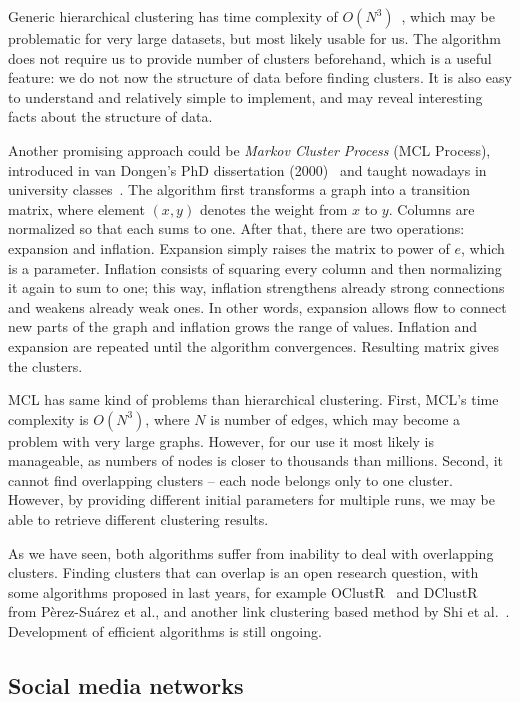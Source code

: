 \documentclass[12pt,a4paper,oneside,pdftex]{report}
\begin{document}
Generic hierarchical clustering has time complexity of $O(N^3)$~\cite{manning2008introduction}, which may be problematic for very large datasets, but most likely usable for us. The algorithm does not require us to provide number of clusters beforehand, which is a useful feature: we do not now the structure of data before finding clusters. It is also easy to understand and relatively simple to implement, and may reveal interesting facts about the structure of data.

Another promising approach could be \emph{Markov Cluster Process} (MCL Process), introduced in van Dongen's PhD dissertation (2000)~\cite{van2000graph} and taught nowadays in university classes~\cite{mlc_macropol}. The algorithm first transforms a graph into a transition matrix, where element $(x,y)$ denotes the weight from $x$ to $y$. Columns are normalized so that each sums to one. After that, there are two operations: expansion and inflation. Expansion simply raises the matrix to power of $e$, which is a parameter. Inflation consists of squaring every column and then normalizing it again to sum to one; this way, inflation strengthens already strong connections and weakens already weak ones. In other words, expansion allows flow to connect new parts of the graph and inflation grows the range of values. Inflation and expansion are repeated until the algorithm convergences. Resulting matrix gives the clusters.

MCL has same kind of problems than hierarchical clustering. First, MCL's time complexity is $O(N^3)$, where $N$ is number of edges, which may become a problem with very large graphs. However, for our use it most likely is manageable, as numbers of nodes is closer to thousands than millions. Second, it cannot find overlapping clusters -- each node belongs only to one cluster. However, by providing different initial parameters for multiple runs, we may be able to retrieve different clustering results.

As we have seen, both algorithms suffer from inability to deal with overlapping clusters. Finding clusters that can overlap is an open research question, with some algorithms proposed in last years, for example OClustR~\cite{PerezSuarez2013234} and DClustR~\cite{PerezSuarez20133040} from P\`{e}rez-Su\'{a}rez et al., and another link clustering based method by Shi et al.~\cite{Shi2013394}. Development of efficient algorithms is still ongoing.


\subsection{Social media networks}
\label{subsec:social_media}
\end{document}
